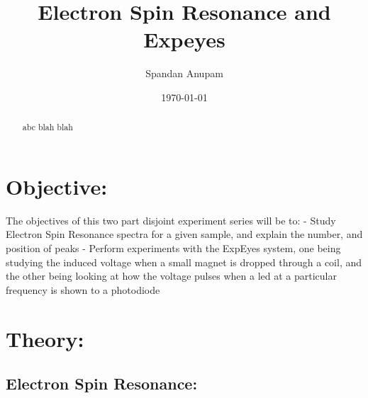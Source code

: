 \documentclass{../_layouts/ieeeconf}
\begin{document}
\title{Electron Spin Resonance and Expeyes}

\author{Spandan Anupam}

\date{\today}
\maketitle

\begin{abstract}
abc blah blah

\end{abstract}
\section{Objective:}
The objectives of this two part disjoint experiment series will be to:
- Study Electron Spin Resonance spectra for a given sample, and explain the number, and position of peaks
- Perform experiments with the ExpEyes system, one being studying the induced voltage when a small magnet is dropped through a coil, and the other being looking at how the voltage pulses when a led at a particular frequency is shown to a photodiode

\section{Theory:}
\subsection{Electron Spin Resonance:}
\end{document}
